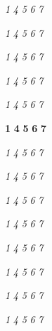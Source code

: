 \usepackage{soul}  %


\let\booktitle\textit
\soulregister\booktitle1
\soulregister\booktitle4
\soulregister\booktitle5
\soulregister\booktitle6
\soulregister\booktitle7

\let\book\textit
\soulregister\book1
\soulregister\book4
\soulregister\book5
\soulregister\book6
\soulregister\book7

\let\journaltitle\textit
\soulregister\journaltitle1
\soulregister\journaltitle4
\soulregister\journaltitle5
\soulregister\journaltitle6
\soulregister\journaltitle7

\let\journal\textit
\soulregister\journal1
\soulregister\journal4
\soulregister\journal5
\soulregister\journal6
\soulregister\journal7

\let\newspaper\textit
\soulregister\newspaper1
\soulregister\newspaper4
\soulregister\newspaper5
\soulregister\newspaper6
\soulregister\newspaper7

\let\vol\textbf    %
\soulregister\vol1
\soulregister\vol4
\soulregister\vol5
\soulregister\vol6
\soulregister\vol7 

\let\latin\textit
\soulregister\latin1
\soulregister\latin4
\soulregister\latin5
\soulregister\latin6
\soulregister\latin7 

\let\binom\textit    %
\soulregister\binom1
\soulregister\binom4
\soulregister\binom5
\soulregister\binom6
\soulregister\binom7 

\let\french\textit
\soulregister\french1
\soulregister\french4
\soulregister\french5
\soulregister\french6
\soulregister\french7

\let\greek\textit
\soulregister\greek1
\soulregister\greek4
\soulregister\greek5
\soulregister\greek6
\soulregister\greek7

\let\german\textit
\soulregister\german1
\soulregister\german4
\soulregister\german5
\soulregister\german6
\soulregister\german7

\let\italian\textit
\soulregister\italian1
\soulregister\italian4
\soulregister\italian5
\soulregister\italian6
\soulregister\italian7

\let\portuguese\textit
\soulregister\portuguese1
\soulregister\portuguese4
\soulregister\portuguese5
\soulregister\portuguese6
\soulregister\portuguese7

\let\port\textit
\soulregister\port1
\soulregister\port4
\soulregister\port5
\soulregister\port6
\soulregister\port7

